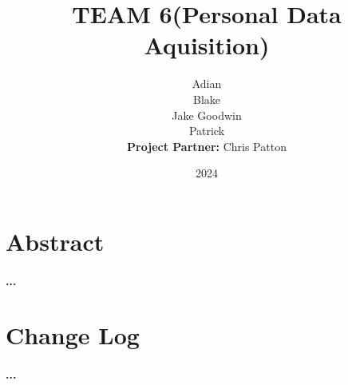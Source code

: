 \documentclass{article}
\title{TEAM 6(Personal Data Aquisition)}
\author{
Adian\\
Blake\\
Jake Goodwin\\
Patrick\\
\textbf{Project Partner:} Chris Patton
}
\date{2024}
\begin{document}
\maketitle
\newpage


\tableofcontents

\newpage

\section{Abstract}
\paragraph{
...
}


\section{Change Log}
\paragraph{
...
}
\end{document}
